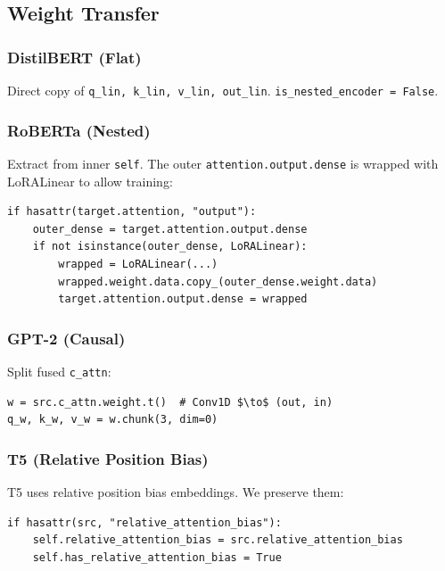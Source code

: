 \subsection{Weight Transfer}

\subsubsection{DistilBERT (Flat)}

Direct copy of \texttt{q\_lin, k\_lin, v\_lin, out\_lin}. \texttt{is\_nested\_encoder = False}.

\subsubsection{RoBERTa (Nested)}

Extract from inner \texttt{self}. The outer \texttt{attention.output.dense} is wrapped 
with LoRALinear to allow training:

\begin{lstlisting}
if hasattr(target.attention, "output"):
    outer_dense = target.attention.output.dense
    if not isinstance(outer_dense, LoRALinear):
        wrapped = LoRALinear(...)
        wrapped.weight.data.copy_(outer_dense.weight.data)
        target.attention.output.dense = wrapped
\end{lstlisting}

\subsubsection{GPT-2 (Causal)}

Split fused \texttt{c\_attn}:

\begin{lstlisting}
w = src.c_attn.weight.t()  # Conv1D $\to$ (out, in)
q_w, k_w, v_w = w.chunk(3, dim=0)
\end{lstlisting}

\subsubsection{T5 (Relative Position Bias)}

T5 uses relative position bias embeddings. We preserve them:

\begin{lstlisting}
if hasattr(src, "relative_attention_bias"):
    self.relative_attention_bias = src.relative_attention_bias
    self.has_relative_attention_bias = True
\end{lstlisting}

